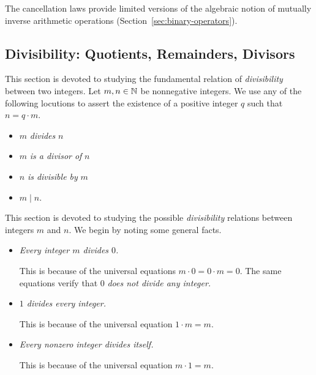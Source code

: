 \noindent
The cancellation laws provide limited versions of the algebraic notion
of mutually inverse arithmetic operations
(Section~\ref{sec:binary-operators}).


\subsection{Divisibility: Quotients, Remainders, Divisors}
\label{sec:divisibility}

This section is devoted to studying the fundamental relation of {\em
  divisibility} between two integers.  Let $m, n \in \mathbb{N}$ be
nonnegative integers.  We use any of the following locutions to assert
the existence of a positive integer $q$ such that $n = q \cdot m$.
\begin{itemize}
\item
$m$ {\it divides} $n$
\item
$m$ {\it is a divisor of} $n$
\item
$n$ {\it is divisible by} $m$
\item
$m \mid n$.
\end{itemize}
This section is devoted to studying the possible {\it divisibility}
relations between integers $m$ and $n$.  We begin by noting some
general facts.
\begin{itemize}
\item
{\em Every integer $m$ divides $0$.}

This is because of the universal equations $m \cdot 0 = 0 \cdot m = 0$.  
The same equations verify that $0$ {\em does not divide any integer.}

\item
{\em $1$ divides every integer.}

This is because of the universal equation $1 \cdot m = m$.
\item
{\em Every nonzero integer divides itself.}

This is because of the universal equation $m \cdot 1 = m$.
\end{itemize}

